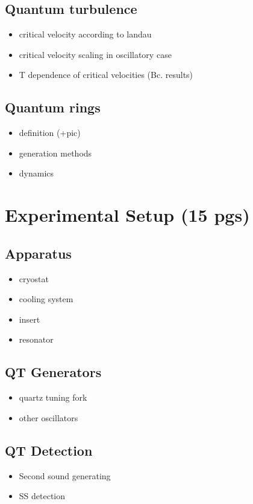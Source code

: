 \documentclass[a4paper, 12pt]{report}
\newcommand{\<}{\langle} %
\renewcommand{\>}{\rangle} %
\begin{document}
\section{Quantum turbulence}
\begin{itemize}
	\item critical velocity according to landau
	\item critical velocity scaling in oscillatory case
	\item T dependence of critical velocities (Bc. results)
\end{itemize}

\section{Quantum rings}
\begin{itemize}
	\item definition (+pic)
	\item generation methods
	\item dynamics
\end{itemize}

\newpage

\chapter{Experimental Setup (15 pgs)}

\section{Apparatus}
\begin{itemize}
	\item cryostat
	\item cooling system
	\item insert
	\item resonator
\end{itemize}

\section{QT Generators}
\begin{itemize}
	\item quartz tuning fork
	\item other oscillators
\end{itemize}

\section{QT Detection}
\begin{itemize}
	\item Second sound generating
	\item SS detection
\end{itemize}
\end{document}
